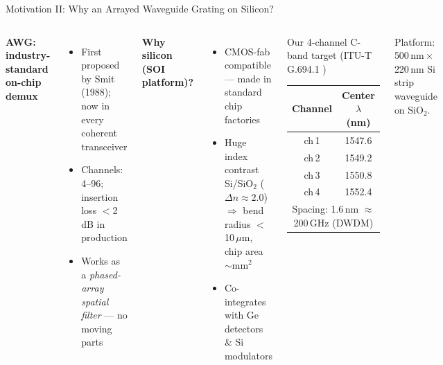 \documentclass[aspectratio=169,10pt]{beamer}
\begin{document}
\begin{frame}{Motivation II: Why an Arrayed Waveguide Grating on Silicon?}
  \begin{columns}[T]
      \textbf{AWG: industry-standard on-chip demux} \footnotemark[3]
      \begin{itemize}\setlength\itemsep{3pt}
        \item First proposed by Smit (1988); now in every coherent transceiver
        \item Channels: 4–96; insertion loss $<$2\,dB in production
        \item Works as a \emph{phased-array spatial filter} — no moving parts
      \end{itemize}
      \vspace{0.4em}
      \textbf{Why silicon (SOI platform)?} \footnotemark[4]
      \begin{itemize}\setlength\itemsep{3pt}
        \item CMOS-fab compatible — made in standard chip factories
        \item Huge index contrast Si/SiO$_2$ ($\Delta n \approx 2.0$)\\
              $\Rightarrow$ bend radius $<$10\,$\mu$m, chip area $\sim$mm$^2$
        \item Co-integrates with Ge detectors \& Si modulators
      \end{itemize}
      \begin{block}{Our 4-channel C-band target (ITU-T G.694.1 \footnotemark[5])}
        \centering\small
        \renewcommand{\arraystretch}{1.15}
        \begin{tabular}{cc}
          \toprule
          Channel & Center $\lambda$ (nm) \\
          \midrule
          ch\,1 & 1547.6 \\
          ch\,2 & 1549.2 \\
          ch\,3 & 1550.8 \\
          ch\,4 & 1552.4 \\
          \midrule
          \multicolumn{2}{c}{Spacing: 1.6\,nm $\approx$ 200\,GHz (DWDM)}\\
          \bottomrule
        \end{tabular}
      \end{block}
      \vspace{0.3em}
      \small Platform: 500\,nm\,$\times$\,220\,nm Si strip waveguide on SiO$_2$.
  \end{columns}
\end{frame}
\end{document}
